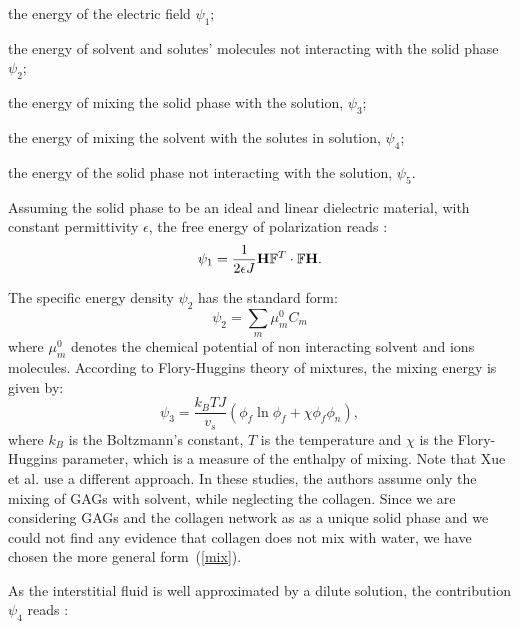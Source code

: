 \begin{enumerate}
	{\indentitem\item[\textbullet] the energy of the electric field $\psi_1$;}
	{\indentitem \item[\textbullet] the energy of solvent and solutes' molecules not interacting with the solid phase $\psi_2$;}
	{\indentitem\item[\textbullet] the energy of mixing the solid phase with the solution, $\psi_3$;}
	{\indentitem\item[\textbullet] the energy of mixing the solvent with the solutes in solution, $\psi_4$;}
	{\indentitem\item[\textbullet] the energy of the solid phase not interacting with the solution, $\psi_5$.}
\end{enumerate}

Assuming the solid phase to be an ideal and linear dielectric material, with constant permittivity $\epsilon$, the free energy of polarization reads \cite{DROZDOV+,Reviewpolyel}:
\begin{gather}
\psi_1 = \frac{1}{2\epsilon J} \mathbf{H}\mathbb{F}^T \cdot \mathbb{F} \mathbf{H}.\label{psi1}
\end{gather}

The specific energy density $\psi_2$ has the standard form:
\begin{equation}
\psi_2 = \sum\limits_{m} \mu^0_m C_m
\end{equation} 
where $\mu^0_m$ denotes the chemical potential of non interacting solvent and ions molecules. According to Flory-Huggins theory \cite{flory,hug} of mixtures, the mixing energy is given by:
\begin{equation}
\psi_3 = \frac{k_B T J}{v_s} \left(\phi_f \ln \phi_f + \chi \phi_f \phi_n\right),\label{mix}
\end{equation}
where $k_B$ is the Boltzmann's constant, $T$ is the temperature and $\chi$ is the Flory-Huggins parameter, which is a measure of the enthalpy of mixing. Note that Xue et al.\cite{ecm1,ecm2} use a different approach. In these studies, the authors assume only the mixing of GAGs with solvent, while neglecting the collagen. Since we are considering GAGs and the collagen network as as a unique solid phase and we could not find any evidence that collagen does not mix with water, we have chosen the more general form~(\ref{mix}).

As the interstitial fluid is well approximated by a dilute solution, the contribution $\psi_4$ reads \cite{Reviewpolyel,ecm1,ecm2}:

